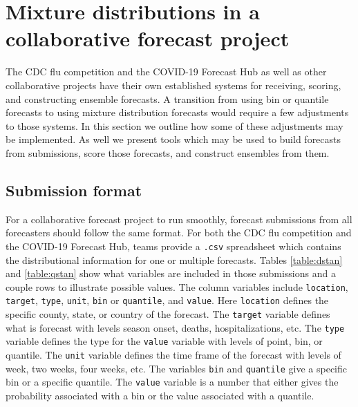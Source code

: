 \documentclass[11pt,notitlepage]{isuthesis}
\begin{document}
\begin{flushleft}
\end{flushleft}



























\chapter{Mixture distributions in a collaborative forecast project}
\label{section:conmixforc}


The CDC flu competition and the COVID-19 Forecast Hub as well as other 
collaborative projects
have their own established systems for receiving, 
scoring, and constructing ensemble forecasts. A transition from using bin or 
quantile forecasts to using mixture distribution forecasts
would require
a few adjustments to those systems. In this section we outline how some of these
adjustments may be implemented. As well we present tools which may be used
to build forecasts from submissions, score those forecasts, and construct 
ensembles from them.

\section{Submission format}
For a collaborative forecast project to run smoothly, forecast submissions from 
all forecasters 
should follow the same format. For both the CDC flu competition and
the COVID-19 Forecast Hub, teams provide a \texttt{.csv} spreadsheet which 
contains the distributional information for one or multiple forecasts. Tables
\ref{table:dstan} and \ref{table:qstan} show what variables are included in 
those submissions and a
couple rows to illustrate possible values.
The column variables include \texttt{location}, \texttt{target}, \texttt{type},
\texttt{unit}, \texttt{bin} or \texttt{quantile}, and \texttt{value}.
Here \texttt{location} defines the specific county, state, or country of the 
forecast. The \texttt{target} variable defines what is forecast with levels
season onset, deaths, hospitalizations, etc. The \texttt{type} variable defines
the type for the \texttt{value} variable with levels of point, 
bin, or quantile.
The \texttt{unit} variable defines the time frame of the forecast with levels of
week,
two weeks, four weeks, etc. The variables \texttt{bin} and \texttt{quantile}
give a specific bin or a specific quantile. The \texttt{value} variable is a 
number that 
either gives the probability associated with a bin or the value associated 
with a quantile.
\end{document}
